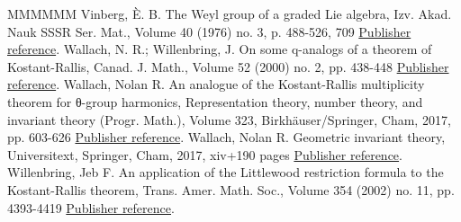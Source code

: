 \documentclass[11pt]{article}
\theoremstyle{definition}
\numberwithin{equation}{section}
\begin{document}
\begin{thebibliography}{MMMMMM}
 Vinberg, È. B. The Weyl group of a graded Lie algebra, Izv. Akad. Nauk SSSR Ser. Mat., Volume 40 (1976) no. 3, p. 488-526, 709 \href{https://alco.centre-mersenne.org/articles/10.5802/alco.391/#Vinberg1976}{Publisher reference}.
 Wallach, N. R.; Willenbring, J. On some q-analogs of a theorem of Kostant-Rallis, Canad. J. Math., Volume 52 (2000) no. 2, pp. 438-448 \href{https://alco.centre-mersenne.org/articles/10.5802/alco.391/#WallachWillenbring2000}{Publisher reference}.
 Wallach, Nolan R. An analogue of the Kostant-Rallis multiplicity theorem for θ-group harmonics, Representation theory, number theory, and invariant theory (Progr. Math.), Volume 323, Birkhäuser/Springer, Cham, 2017, pp. 603-626 \href{https://alco.centre-mersenne.org/articles/10.5802/alco.391/#Wallach2017}{Publisher reference}.
 Wallach, Nolan R. Geometric invariant theory, Universitext, Springer, Cham, 2017, xiv+190 pages \href{https://alco.centre-mersenne.org/articles/10.5802/alco.391/#Wallach2017-2}{Publisher reference}.
 Willenbring, Jeb F. An application of the Littlewood restriction formula to the Kostant-Rallis theorem, Trans. Amer. Math. Soc., Volume 354 (2002) no. 11, pp. 4393-4419 \href{https://alco.centre-mersenne.org/articles/10.5802/alco.391/#Willenbring2002}{Publisher reference}.
\end{thebibliography}
\end{document}
